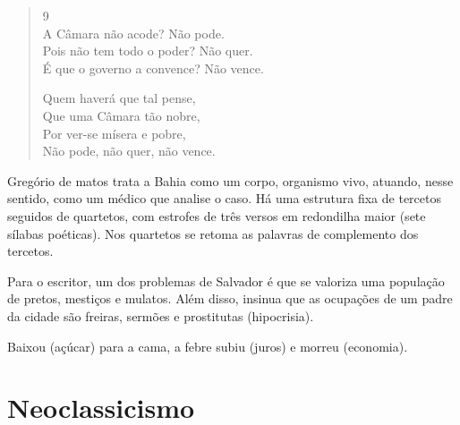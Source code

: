 \documentclass[12pt]{book}
\begin{document}
\begin{verse}
			9 \\
			A Câmara não acode? \dotfill Não pode. \\
			Pois não tem todo o poder? \dotfill Não quer. \\
			É que o governo a convence? \dotfill Não vence.
			
			\hspace{5em} Quem haverá que tal pense, \\
			\hspace{5em} Que uma Câmara tão nobre, \\
			\hspace{5em} Por ver-se mísera e pobre, \\
			\hspace{5em} Não pode, não quer, não vence. 
		\end{verse}
		\par Gregório de matos trata a Bahia como um corpo, organismo vivo, atuando, nesse sentido, como um médico que analise o caso. Há uma estrutura fixa de tercetos seguidos de quartetos, com estrofes de três versos em redondilha maior (sete sílabas poéticas). Nos quartetos se retoma as palavras de complemento dos tercetos.
		\par Para o escritor, um dos problemas de Salvador é que se valoriza uma população de pretos, mestiços e mulatos. Além disso, insinua que as ocupações de um padre da cidade são freiras, sermões e prostitutas (hipocrisia).
		\par Baixou (açúcar) para a cama, a febre subiu (juros) e morreu (economia).
		
	\part{Neoclassicismo}
	
\end{document}
